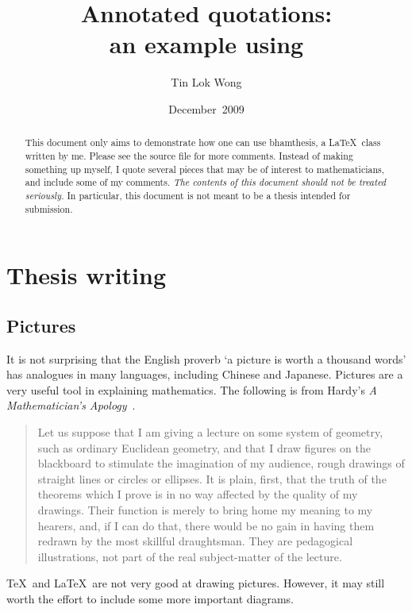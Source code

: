 \documentclass{bhamthesis}
\title{Annotated quotations:\\
       an example using \clsname}
\author{Tin Lok Wong}
\date{December~2009}  %
\theoremstyle{definition}
\newcommand{\clsname}{\textsf{bhamthesis}}
\newcommand{\bktitle}[1]{\textit{#1}}
\begin{document}
\frontmatter
\maketitle

\begin{abstract}
 This document only aims to demonstrate how one can use \clsname,
 a \LaTeX\ class written by me.  Please see the source file for
 more comments.  Instead of making something up myself, I quote
 several pieces that may be of interest to mathematicians, and
 include some of my comments. \emph{The contents of this document
 should not be treated seriously.}  In particular, this document
 is not meant to be a thesis intended for submission.
\end{abstract}

\tableofcontents


\mainmatter
\chapter{Thesis writing}
\section{Pictures}
It is not surprising that the English proverb `a picture is worth
a thousand words' has analogues in many languages, including
Chinese and Japanese.  Pictures are a very useful tool in
explaining mathematics.  The following is from Hardy's \bktitle{A
Mathematician's Apology}~\cite[\S23]{book:math-apol}.
\begin{quotation}
 Let us suppose that I am giving a lecture on some system of
 geometry, such as ordinary Euclidean geometry, and that I draw
 figures on the blackboard to stimulate the imagination of my
 audience, rough drawings of straight lines or circles or
 ellipses.  It is plain, first, that the truth of the theorems
 which I prove is in no way affected by the quality of my
 drawings.  Their function is merely to bring home my meaning
 to my hearers, and, if I can do that, there would be no gain in
 having them redrawn by the most skillful draughtsman.  They are
 pedagogical illustrations, not part of the real subject-matter
 of the lecture.
\end{quotation}
\TeX\ and \LaTeX\ are not very good at drawing pictures.  However,
it may still worth the effort to include some more important
diagrams.
\end{document}
